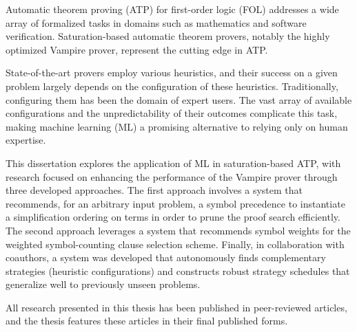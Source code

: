 Automatic theorem proving (ATP) for first-order logic (FOL) addresses a wide array of formalized tasks in domains such as mathematics and software verification. Saturation-based automatic theorem provers, notably the highly optimized Vampire prover, represent the cutting edge in ATP.

State-of-the-art provers employ various heuristics, and their success on a given problem largely depends on the configuration of these heuristics. Traditionally, configuring them has been the domain of expert users. The vast array of available configurations and the unpredictability of their outcomes complicate this task, making machine learning (ML) a promising alternative to relying only on human expertise.

This dissertation explores the application of ML in saturation-based ATP, with research focused on enhancing the performance of the Vampire prover through three developed approaches. The first approach involves a system that recommends, for an arbitrary input problem, a symbol precedence to instantiate a simplification ordering on terms in order to prune the proof search efficiently. The second approach leverages a system that recommends symbol weights for the weighted symbol-counting clause selection scheme. Finally, in collaboration with coauthors, a system was developed that autonomously finds complementary strategies (heuristic configurations) and constructs robust strategy schedules that generalize well to previously unseen problems.

All research presented in this thesis has been published in peer-reviewed articles, and the thesis features these articles in their final published forms.
